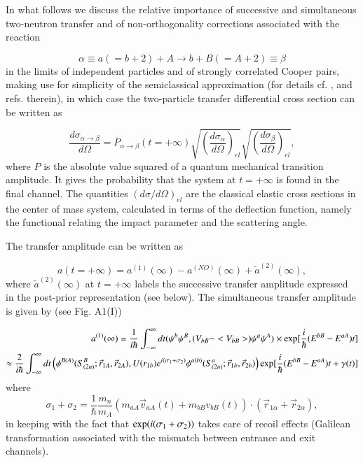 \documentclass[a4paper,14pt]{article}
\begin{document}
In what follows we discuss the relative importance of successive and simultaneous two-neutron transfer and of non-orthogonality 
corrections associated with the reaction 

\begin{equation}
\alpha \equiv  a(=b+2) + A \to b + B(=A+2) \equiv \beta 
\label{A1}
\end{equation}
in the limits of independent particles and of strongly correlated Cooper pairs, making use for simplicity of the semiclassical approximation (for details cf. \cite{Broglia:04a},\cite{Broglia:75}  and refs. therein), in which case the two-particle transfer differential cross section can be written as

\begin{equation}
\frac{d \sigma_{\alpha \to \beta} }{d \Omega} = P_{\alpha \to \beta} (t = +\infty) 
\sqrt{ \left( \frac{d \sigma_{\alpha}}{d \Omega} \right)_{el} }
\sqrt{ \left( \frac{d \sigma_{\beta}}{d \Omega} \right)_{el}}, 
\label{A2}
\end{equation}
where $P$ is the absolute value squared of a quantum mechanical transition amplitude. It gives the probability that the system at $t = + \infty$ is found in the final channel. The quantities $(d \sigma/d\Omega)_{el}$ are the classical elastic cross sections  in the center of mass system, calculated in terms of the deflection function, namely the functional relating the impact parameter and the scattering angle. 

The transfer amplitude can be written as  


\begin{equation}
a(t = + \infty) = a^{(1)}(\infty) - a^{(NO)}(\infty) + \tilde a^{(2)} ( \infty),
\label{A3}
\end{equation}
where $\tilde a^{(2)}(\infty)$ at $t= + \infty$ 
labels  the successive transfer amplitude expressed in the post-prior representation (see below).
The simultaneous transfer amplitude is given by (see Fig. A1(I))

\begin{eqnarray}
a^{(1)} (\infty) = \frac{1}{i \hbar} \int^{\infty}_{-\infty} dt (\psi^b \psi^B, (V_{bB} - <V_{bB}>) \psi^a \psi^A ) \times 
{\rm exp} [\frac{i}{\hbar} (E^{bB} - E^{aA}) t] \nonumber \\
\approx \frac{2}{i \hbar} \int^{\infty}_{- \infty}  dt \left( \phi^{B(A)} (S^B_{(2n)}; \vec r_{1A}, \vec r_{2A}), U(r_{1b}) 
e^{i (\sigma_1 + \sigma_2)}
\phi^{a(b)} (S^a_{(2n)}; \vec r_{1b}, \vec r_{2b}) \right) {\rm exp} [\frac{i}{\hbar} (E^{bB} - E^{aA}) t + \gamma(t)] 
\end{eqnarray}
where 
\begin{equation}
\sigma_1 + \sigma_2 = \frac{1}{\hbar} \frac{m_n}{m_A} ( m_{aA} \vec v_{aA} (t) + m_{bB} v_{bB}(t)) \cdot (\vec r_{1\alpha}
+ \vec r_{2 \alpha}),
\end{equation}
in keeping with the fact that ${\rm exp} ( i (\sigma_1 + \sigma_2))$ takes care of recoil 
effects (Galilean transformation associated with the mismatch between entrance and exit channels). 
\end{document}
